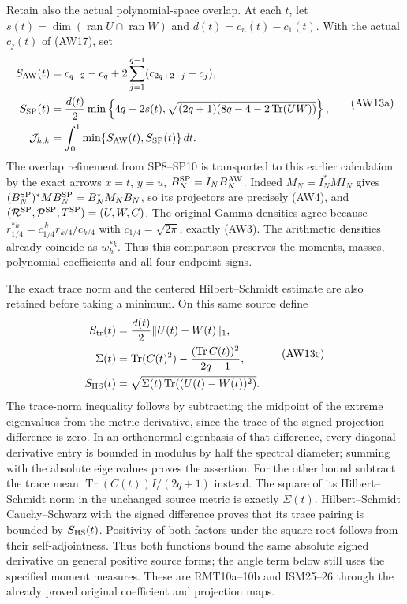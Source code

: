 Retain also the actual polynomial-space overlap. At each $t$, let
$s(t)=\dim(\operatorname{ran}U\cap\operatorname{ran}W)$ and
$d(t)=c_n(t)-c_1(t)$. With the actual $c_j(t)$ of (AW17), set
\[
 \begin{aligned}
 S_{\rm AW}(t)&=c_{q+2}-c_q+
          2\sum_{j=1}^{q-1}(c_{2q+2-j}-c_j),\\
 S_{\rm SP}(t)&=\frac{d(t)}2\min\left\{4q-2s(t),
       \sqrt{(2q+1)(8q-4-2\operatorname{Tr}(UW))}\right\},\\
 \mathcal J_{h,k}&=\int_0^1\min\{S_{\rm AW}(t),S_{\rm SP}(t)\}\,dt.
 \end{aligned}
 \tag{AW13a}
\]
The overlap refinement from SP8--SP10 is transported to this
earlier calculation by the exact arrows
$x=t$, $y=u$, $B_N^{\rm SP}=I_NB_N^{\rm AW}$.
Indeed $M_N=I_N^*MI_N$ gives
$(B_N^{\rm SP})^*MB_N^{\rm SP}=B_N^*M_NB_N$, so its projectors
are precisely (AW4), and $(\mathcal R^{\rm SP},\mathcal P^{\rm SP},
T^{\rm SP})=(U,W,C)$. The original Gamma densities agree because
$r_{1/4}^{*k}=c_{1/4}^{\,k}r_{k/4}/c_{k/4}$ with
$c_{1/4}=\sqrt{2\pi}$, exactly (AW3). The arithmetic densities
already coincide as $w_h^{*k}$. Thus this comparison preserves
the moments, masses, polynomial coefficients and all four endpoint signs.



The exact trace norm and the centered Hilbert--Schmidt estimate
are also retained before taking a minimum. On this same source define
\[
 \begin{aligned}
 S_{\rm tr}(t)&=\frac{d(t)}{2}\|U(t)-W(t)\|_1,\\
 \Sigma(t)&=\operatorname{Tr}(C(t)^2)
       -\frac{(\operatorname{Tr}C(t))^2}{2q+1},\\
 S_{\rm HS}(t)&=\sqrt{\Sigma(t)\operatorname{Tr}((U(t)-W(t))^2)}.
 \end{aligned}
 \tag{AW13c}
\]
The trace-norm inequality follows by subtracting the midpoint
of the extreme eigenvalues from the metric derivative, since the
trace of the signed projection difference is zero. In an orthonormal
eigenbasis of that difference, every diagonal derivative entry is
bounded in modulus by half the spectral diameter; summing with
the absolute eigenvalues proves the assertion.
For the other bound subtract the trace mean
$\operatorname{Tr}(C(t))I/(2q+1)$ instead.
The square of its Hilbert--Schmidt norm in the unchanged source
metric is exactly $\Sigma(t)$. Hilbert--Schmidt Cauchy--Schwarz
with the signed difference proves that its trace pairing is bounded
by $S_{\rm HS}(t)$. Positivity of both factors under the square
root follows from their self-adjointness. Thus both functions bound
the same absolute signed derivative on general positive source forms;
the angle term below still uses the specified moment measures.
These are RMT10a--10b and ISM25--26 through the already proved
original coefficient and projection maps.

